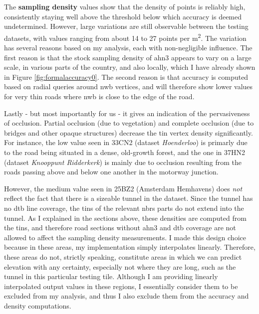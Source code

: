 The \textbf{sampling density} values show that the density of points is reliably high, consistently staying well above the threshold below which accuracy is deemed undetermined. However, large variations are still observable between the testing datasets, with values ranging from about 14 to 27 points per m\textsuperscript{2}. The variation has several reasons based on my analysis, each with non-negligible influence. The first reason is that the stock sampling density of \ac{ahn3} appears to vary on a large scale, in various parts of the country, and also locally, which I have already shown in Figure \ref{fig:formalaccuracy0}. The second reason is that accuracy is computed based on radial queries around \ac{nwb} vertices, and will therefore show lower values for very thin roads where \ac{nwb} is close to the edge of the road.

Lastly - but most importantly for us - it gives an indication of the pervasiveness of occlusion. Partial occlusion (due to vegetation) and complete occlusion (due to bridges and other opaque structures) decrease the \ac{tin} vertex density significantly. For instance, the low value seen in 33CN2 (dataset \textit{Hoenderloo}) is primarly due to the road being situated in a dense, old-growth forest, and the one in 37HN2 (dataset \textit{Knooppunt Ridderkerk}) is mainly due to occlusion resulting from the roads passing above and below one another in the motorway junction.

However, the medium value seen in 25BZ2 (Amsterdam Hemhavens) does \textit{not} reflect the fact that there is a sizeable tunnel in the dataset. Since the tunnel has no \ac{dtb} line coverage, the \ac{tin}s of the relevant \ac{nbrs} parts do not extend into the tunnel. As I explained in the sections above, these densities are computed from the \ac{tin}s, and therefore road sections without \ac{ahn3} and \ac{dtb} coverage are not allowed to affect the sampling density measurements. I made this design choice because in these areas, my implementation simply interpolates linearly. Therefore, these areas do not, strictly speaking, constitute areas in which we can predict elevation with any certainty, especially not where they are long, such as the tunnel in this particular testing tile. Although I am providing linearly interpolated output values in these regions, I essentially consider them to be excluded from my analysis, and thus I also exclude them from the accuracy and density computations.

